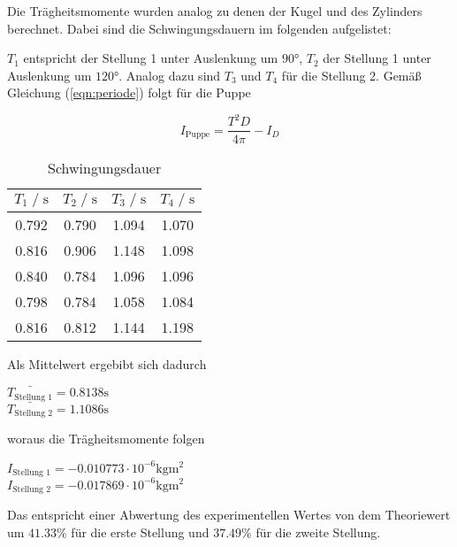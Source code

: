 Die Trägheitsmomente wurden analog zu denen der Kugel und des Zylinders berechnet. Dabei sind die Schwingungsdauern im folgenden
aufgelistet:

$T_1$ entspricht der Stellung 1 unter Auslenkung um $90°$, $T_2$ der Stellung 1 unter Auslenkung um $120°$.
Analog dazu sind $T_3$ und $T_4$ für die Stellung 2. Gemäß Gleichung (\autoref{eqn:periode}) folgt für die Puppe


\begin{equation}
  I_{\text{Puppe}} = \frac{T^2D}{4\pi} - I_D
\end{equation}

\begin{table}
    \centering
        \caption{Schwingungsdauer}
        \label{tab:schwingdauer}
        \begin{tabular}{c c c c}
        \toprule
        $T_1 \;/\; \si{\second}$ & $T_2 \;/\; \si{\second}$ & $T_3 \;/\; \si{\second}$ & $T_4 \;/\; \si{\second}$ \\
        \midrule
        0.792 & 0.790 & 1.094 & 1.070 \\
        0.816 & 0.906 & 1.148 & 1.098 \\
        0.840 & 0.784 & 1.096 & 1.096 \\
        0.798 & 0.784 & 1.058 & 1.084 \\
        0.816 & 0.812 & 1.144 & 1.198 \\
        \bottomrule
    \end{tabular}
\end{table}

Als Mittelwert ergebibt sich dadurch
\begin{center}
  $\bar{T_{\text{Stellung 1}}} = 0.8138 \si{\second}$ \\
  $\bar{T_{\text{Stellung 2}}} = 1.1086 \si{\second}$ \\
\end{center}

woraus die Trägheitsmomente folgen %
\begin{center}
  $I_{\text{Stellung 1}} = -0.010773 \cdot 10^{-6} \si{\kilogram\meter^2}$ \\
  $I_{\text{Stellung 2}} = -0.017869 \cdot 10^{-6} \si{\kilogram\meter^2}$ \\
\end{center}

Das entspricht einer Abwertung des experimentellen Wertes von dem Theoriewert um $41.33 \%$ für die erste Stellung und
$37.49 \%$ für die zweite Stellung.

